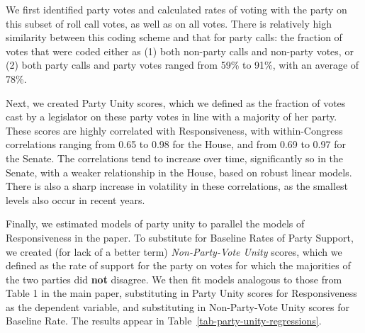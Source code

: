 \documentclass[12pt]{article}
\begin{document}
We first identified party votes and calculated rates of voting with the party
on this subset of roll call votes, as well as on all votes.
There is relatively high similarity between this coding scheme and that for
party calls: the fraction of votes that were coded either as (1) both non-party
calls and non-party votes, or (2) both party calls and party votes ranged from
59\% to 91\%, with an average of 78\%.

Next, we created Party Unity scores, which we defined as the fraction of votes
cast by a legislator on these party votes in line with a majority of her party.
These scores are highly correlated with Responsiveness, with within-Congress
correlations ranging from 0.65 to 0.98 for the House, and from 0.69 to 0.97 for
the Senate.
The correlations tend to increase over time, significantly so in the Senate,
with a weaker relationship in the House, based on robust linear models.
There is also a sharp increase in volatility in these correlations, as the
smallest levels also occur in recent years.

Finally, we estimated models of party unity to parallel the models of
Responsiveness in the paper.
To substitute for Baseline Rates of Party Support, we created (for lack of
a better term) \emph{Non-Party-Vote Unity} scores, which we defined as the rate
of support for the party on votes for which the majorities of the two parties
did \textbf{not} disagree.
We then fit models analogous to those from Table 1 in the main paper,
substituting in Party Unity scores for Responsiveness as the dependent variable,
and substituting in Non-Party-Vote Unity scores for Baseline Rate.
The results appear in Table~\ref{tab-party-unity-regressions}.
\end{document}
